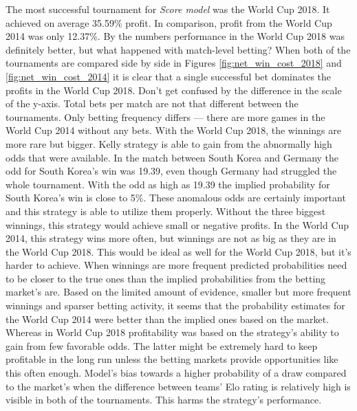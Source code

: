 The most successful tournament for \textit{Score model} was the World Cup 2018. It achieved on average 35.59\% profit. In comparison, profit from the World Cup 2014 was only 12.37\%. By the numbers performance in the World Cup 2018 was definitely better, but what happened with match-level betting? When both of the tournaments are compared side by side in Figures \ref{fig:net_win_cost_2018} and \ref{fig:net_win_cost_2014} it is clear that a single successful bet dominates the profits in the World Cup 2018. Don't get confused by the difference in the scale of the y-axis. Total bets per match are not that different between the tournaments. Only betting frequency differs --- there are more games in the World Cup 2014 without any bets. With the World Cup 2018, the winnings are more rare but bigger. Kelly strategy is able to gain from the abnormally high odds that were available. In the match between South Korea and Germany the odd for South Korea's win was 19.39, even though Germany had struggled the whole tournament. With the odd as high as 19.39 the implied probability for South Korea's win is close to 5\%. These anomalous odds are certainly important and this strategy is able to utilize them properly. Without the three biggest winnings, this strategy would achieve small or negative profits. In the World Cup 2014, this strategy wins more often, but winnings are not as big as they are in the World Cup 2018. This would be ideal as well for the World Cup 2018, but it's harder to achieve. When winnings are more frequent predicted probabilities need to be closer to the true ones than the implied probabilities from the betting market's are. Based on the limited amount of evidence, smaller but more frequent winnings and sparser betting activity, it seems that the probability estimates for the World Cup 2014 were better than the implied ones based on the market. Whereas in World Cup 2018 profitability was based on the strategy's ability to gain from few favorable odds. The latter might be extremely hard to keep profitable in the long run unless the betting markets provide opportunities like this often enough. Model's bias towards a higher probability of a draw compared to the market's when the difference between teams' Elo rating is relatively high is visible in both of the tournaments. This harms the strategy's performance.


